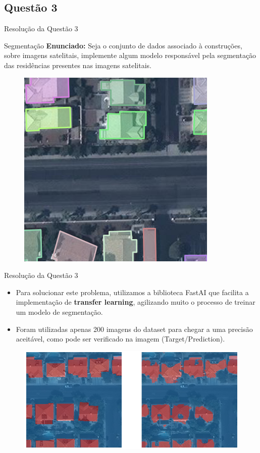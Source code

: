 \documentclass[xcolor=dvipsnames]{beamer}
\begin{document}
	\subsection{Questão 3}
	\begin{frame}{Resolução da Questão 3}
		\begin{block}{Segmentação}
			\textbf{Enunciado:} Seja o conjunto de dados associado à construções, sobre imagens satelitais, implemente algum modelo responsável pela segmentação das residências presentes nas imagens satelitais.
		\end{block}
		\begin{figure}
			\centering
			\includegraphics[width=0.45\columnwidth]{Figuras/res3-1.png}
		\end{figure}
	\end{frame}


	\begin{frame}{Resolução da Questão 3}
		\begin{itemize}
			\item Para solucionar este problema, utilizamos a biblioteca FastAI que facilita a implementação de \textbf{transfer learning}, agilizando muito o processo de treinar um modelo de segmentação.
			\item Foram utilizadas apenas 200 imagens do dataset para chegar a uma precisão aceitável, como pode ser verificado na imagem (Target/Prediction).
		\end{itemize}
		\begin{figure}
			\centering
			\includegraphics[width=0.8\columnwidth]{Figuras/res3-3.png}
		\end{figure}
	\end{frame}
\end{document}
